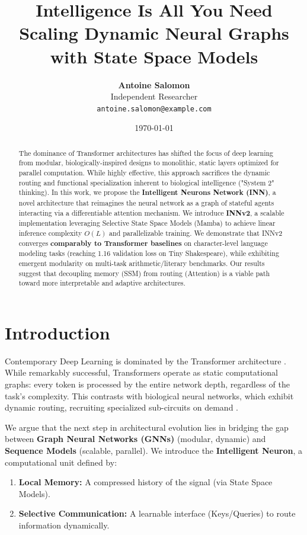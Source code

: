 \documentclass[a4paper,11pt]{article}
\title{\textbf{Intelligence Is All You Need}\\ \large Scaling Dynamic Neural Graphs with State Space Models}
\author{
  \textbf{Antoine Salomon} \\
  Independent Researcher \\
  \texttt{antoine.salomon@example.com}
}
\date{\today}
\begin{document}
\maketitle

\begin{abstract}
The dominance of Transformer architectures has shifted the focus of deep learning from modular, biologically-inspired designs to monolithic, static layers optimized for parallel computation. While highly effective, this approach sacrifices the dynamic routing and functional specialization inherent to biological intelligence ("System 2" thinking). In this work, we propose the \textbf{Intelligent Neurons Network (INN)}, a novel architecture that reimagines the neural network as a graph of stateful agents interacting via a differentiable attention mechanism. 
We introduce \textbf{INNv2}, a scalable implementation leveraging Selective State Space Models (Mamba) to achieve linear inference complexity $O(L)$ and parallelizable training. We demonstrate that INNv2 converges \textbf{comparably to Transformer baselines} on character-level language modeling tasks (reaching 1.16 validation loss on Tiny Shakespeare), while exhibiting emergent modularity on multi-task arithmetic/literary benchmarks. Our results suggest that decoupling memory (SSM) from routing (Attention) is a viable path toward more interpretable and adaptive architectures.
\end{abstract}

\section{Introduction}

Contemporary Deep Learning is dominated by the Transformer architecture \citep{vaswani2017attention}. While remarkably successful, Transformers operate as static computational graphs: every token is processed by the entire network depth, regardless of the task's complexity. This contrasts with biological neural networks, which exhibit dynamic routing, recruiting specialized sub-circuits on demand \citep{kahneman2011thinking}.

We argue that the next step in architectural evolution lies in bridging the gap between \textbf{Graph Neural Networks (GNNs)} (modular, dynamic) and \textbf{Sequence Models} (scalable, parallel). We introduce the \textbf{Intelligent Neuron}, a computational unit defined by:
\begin{enumerate}
    \item \textbf{Local Memory:} A compressed history of the signal (via State Space Models).
    \item \textbf{Selective Communication:} A learnable interface (Keys/Queries) to route information dynamically.
\end{enumerate}
\end{document}
